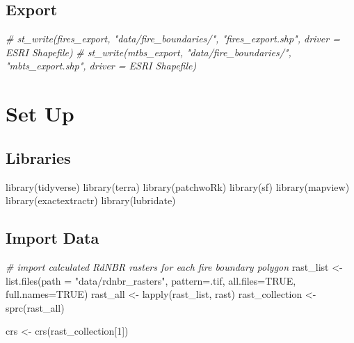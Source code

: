 \documentclass[
]{book}
\newenvironment{Shaded}{\begin{snugshade}}{\end{snugshade}}
\newcommand{\AttributeTok}[1]{\textcolor[rgb]{0.77,0.63,0.00}{#1}}
\newcommand{\CommentTok}[1]{\textcolor[rgb]{0.56,0.35,0.01}{\textit{#1}}}
\newcommand{\ConstantTok}[1]{\textcolor[rgb]{0.00,0.00,0.00}{#1}}
\newcommand{\DecValTok}[1]{\textcolor[rgb]{0.00,0.00,0.81}{#1}}
\newcommand{\FunctionTok}[1]{\textcolor[rgb]{0.00,0.00,0.00}{#1}}
\newcommand{\NormalTok}[1]{#1}
\newcommand{\OtherTok}[1]{\textcolor[rgb]{0.56,0.35,0.01}{#1}}
\newcommand{\StringTok}[1]{\textcolor[rgb]{0.31,0.60,0.02}{#1}}
\begin{document}
\hypertarget{export}{%
\section{Export}\label{export}}

\begin{Shaded}
\begin{Highlighting}[]
\CommentTok{\# st\_write(fires\_export, "data/fire\_boundaries/", "fires\_export.shp", driver = \textquotesingle{}ESRI Shapefile\textquotesingle{})}
\CommentTok{\# st\_write(mtbs\_export, "data/fire\_boundaries/", "mbts\_export.shp", driver = \textquotesingle{}ESRI Shapefile\textquotesingle{})}
\end{Highlighting}
\end{Shaded}

\hypertarget{set-up-1}{%
\chapter{Set Up}\label{set-up-1}}

\hypertarget{libraries}{%
\section{Libraries}\label{libraries}}

\begin{Shaded}
\begin{Highlighting}[]
\FunctionTok{library}\NormalTok{(tidyverse)}
\FunctionTok{library}\NormalTok{(terra)}
\FunctionTok{library}\NormalTok{(patchwoRk)}
\FunctionTok{library}\NormalTok{(sf)}
\FunctionTok{library}\NormalTok{(mapview)}
\FunctionTok{library}\NormalTok{(exactextractr)}
\FunctionTok{library}\NormalTok{(lubridate)}
\end{Highlighting}
\end{Shaded}

\hypertarget{import-data-1}{%
\section{Import Data}\label{import-data-1}}

\begin{Shaded}
\begin{Highlighting}[]
\CommentTok{\# import calculated RdNBR rasters for each fire boundary polygon}
\NormalTok{rast\_list }\OtherTok{\textless{}{-}} \FunctionTok{list.files}\NormalTok{(}\AttributeTok{path =} \StringTok{"data/rdnbr\_rasters"}\NormalTok{, }\AttributeTok{pattern=}\StringTok{\textquotesingle{}.tif\textquotesingle{}}\NormalTok{, }\AttributeTok{all.files=}\ConstantTok{TRUE}\NormalTok{, }\AttributeTok{full.names=}\ConstantTok{TRUE}\NormalTok{)}
\NormalTok{rast\_all }\OtherTok{\textless{}{-}} \FunctionTok{lapply}\NormalTok{(rast\_list, rast)}
\NormalTok{rast\_collection }\OtherTok{\textless{}{-}} \FunctionTok{sprc}\NormalTok{(rast\_all)}

\NormalTok{crs }\OtherTok{\textless{}{-}} \FunctionTok{crs}\NormalTok{(rast\_collection[}\DecValTok{1}\NormalTok{])}
\end{Highlighting}
\end{Shaded}
\end{document}
